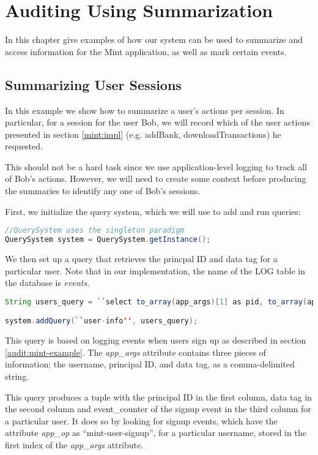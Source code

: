 \chapter{Auditing Using Summarization}

In this chapter give examples of how our system can be used to summarize and access information for the Mint application, as well as mark certain events.

\section{Summarizing User Sessions}
\label{sum:sessions}
In this example we show how to summarize a user's actions per session. In particular, for a session for the user Bob, we will record which of the user actions presented in section \ref{mint:impl} (e.g. addBank, downloadTransactions) he requested.

This should not be a hard task since we use application-level logging to track all of Bob's actions. However, we will need to create some context before producing the summaries to identify any one of Bob's sessions.

First, we initialize the query system, which we will use to add and run queries:

\begin{lstlisting}[language=Java]
//QuerySystem uses the singleton paradigm
QuerySystem system = QuerySystem.getInstance();
\end{lstlisting}

We then set up a query that retrieves the princpal ID and data tag for a particular user. Note that in our implementation, the name of the LOG table in the database is \emph{events}.

\begin{lstlisting}[language=Java]
String users_query = ``select to_array(app_args)[1] as pid, to_array(app_args)[2] as tag, event_counter from events where app_op='mint-user-signup' and to_array(app_args)[0] = ?'';

system.addQuery(``user-info'', users_query);
\end{lstlisting}

\noindent
This query is based on logging events when users sign up as described in section \ref{audit:mint-example}. The \emph{app\_args} attribute contains three pieces of information; the username, principal ID, and data tag, as a comma-delimited string.

This query produces a tuple with the principal ID in the first column, data tag in the second column and event\_counter of the signup event in the third column for a particular user. It does so by looking for signup events, which have the attribute \emph{app\_op} as ``mint-user-signup'', for a particular username, stored in the first index of the \emph{app\_args} attribute. 

